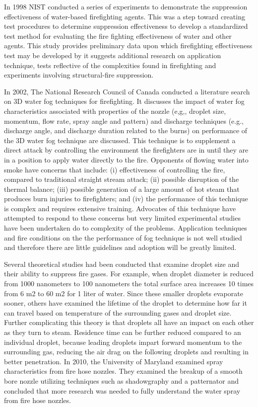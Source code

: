 \documentclass[12pt,oneside]{book}
\begin{document}
In 1998 NIST conducted a series of experiments to demonstrate the suppression effectiveness of water-based firefighting agents. This was a step toward creating test procedures to determine suppression effectiveness to develop a standardized test method for evaluating the fire fighting effectiveness of water and other agents. This study provides preliminary data upon which firefighting effectiveness test may be developed by it suggests additional research on application technique, tests reflective of the complexities found in firefighting and experiments involving structural-fire suppression.  

In 2002, The National Research Council of Canada conducted a literature search on 3D water fog techniques for firefighting. It discusses the impact of water fog characteristics associated with properties of the nozzle (e,g,, droplet size, momentum, flow rate, spray angle and pattern) and discharge techniques (e.g., discharge angle, and discharge duration related to the burns) on performance of the 3D water fog technique are discussed. This technique is to supplement a direct attack by controlling the environment the firefighters are in until they are in a position to apply water directly to the fire. Opponents of flowing water into smoke have concerns that include: (i) effectiveness of controlling the fire, compared to traditional straight stream attack; (ii) possible disruption of the thermal balance; (iii) possible generation of a large amount of hot steam that produces burn injuries to firefighters; and (iv) the performance of this technique is complex and requires extensive training. Advocates of this technique have attempted to respond to these concerns but very limited experimental studies have been undertaken do to complexity of the problems. Application techniques and fire conditions on the the performance of fog technique is not well studied and therefore there are little guidelines and adoption will be greatly limited.

Several theoretical studies had been conducted that examine droplet size and their ability to suppress fire gases. For example, when droplet diameter is reduced from 1000 nanometers to 100 nanometers the total surface area increases 10 times from 6 m2 to 60 m2 for 1 liter of water. Since these smaller droplets evaporate sooner, others have examined the lifetime of the droplet to determine how far it can travel based on temperature of the surrounding gases and droplet size. Further complicating this theory is that droplets all have an impact on each other as they turn to steam. Residence time can be further reduced compared to an individual droplet, because leading droplets impart forward momentum to the surrounding gas, reducing the air drag on the following droplets and resulting in better penetration. In 2010, the University of Maryland examined spray characteristics from fire hose nozzles. They examined the breakup of a smooth bore nozzle utilizing techniques such as shadowgraphy and a patternator and concluded that more research was needed to fully understand the water spray from fire hose nozzles.  
\end{document}
